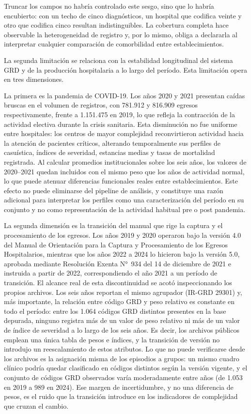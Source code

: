 Truncar los campos no habría controlado este sesgo, sino que lo habría
encubierto: con un techo de cinco diagnósticos, un hospital que codifica veinte
y otro que codifica cinco resultan indistinguibles. La cobertura completa hace
observable la heterogeneidad de registro y, por lo mismo, obliga a declararla
al interpretar cualquier comparación de comorbilidad entre establecimientos.

La segunda limitación se relaciona con la estabilidad longitudinal del sistema
GRD y de la producción hospitalaria a lo largo del período. Esta limitación opera
en tres dimensiones.

La primera es la pandemia de COVID-19. Los años 2020 y 2021 presentan caídas
bruscas en el volumen de registros, con 781.912 y 816.909 egresos
respectivamente, frente a 1.151.475 en 2019, lo que refleja la contracción de
la actividad electiva durante la crisis sanitaria. Esta disminución no fue uniforme entre
hospitales: los centros de mayor complejidad reconvirtieron actividad hacia la
atención de pacientes críticos, alterando temporalmente sus perfiles de
casuística, índices de severidad, estancias medias y tasas de mortalidad
registrada. Al calcular promedios institucionales sobre los seis años, los
valores de 2020--2021 quedan incluidos con el mismo peso que los años de
actividad normal, lo que puede atenuar diferencias funcionales reales entre
establecimientos. Este efecto no puede eliminarse del pipeline de análisis, y
constituye una razón adicional para interpretar los perfiles como una
caracterización del período en su conjunto y no como representación de la
actividad habitual pre o post pandemia.

La segunda dimensión es la transición del manual que rige la captura y el
procesamiento de los egresos. Los años 2019 y 2020 operaron bajo la versión 4.0
del Manual de Orientación para la Captura y Procesamiento de los Egresos
Hospitalarios, mientras que los años 2022 a 2024 lo hicieron bajo la versión 5.0,
aprobada mediante Resolución Exenta N°~934 del 14 de diciembre de 2021 e
instruida a partir de 2022, correspondiendo el año 2021 a un período de
transición. El alcance real de esta discontinuidad se acotó inspeccionando los
propios archivos. Los seis años reportan el mismo agrupador (IR-GRD 29301) y,
más importante, la relación entre código GRD y peso relativo es constante en
todo el período: entre los 1.064 códigos GRD distintos presentes en la base
depurada, ninguno registra más de un valor de peso relativo ni más de un valor
de índice de severidad a lo largo de los seis años. Es decir, los archivos
públicos emplean una única tabla de pesos e índices, y la transición de versión
no introdujo un reescalamiento de estos atributos. Lo que no puede verificarse
desde los archivos es la asignación misma de los episodios a grupos: un mismo
cuadro clínico podría quedar clasificado en códigos distintos según la versión
vigente, y el conjunto de códigos GRD observados varía moderadamente entre años
(de 1.053 en 2019 a 989 en 2024). Ese margen de incertidumbre, y no una
diferencia de pesos, es el ruido que la transición introduce en los indicadores
de complejidad que cruzan el cambio.

